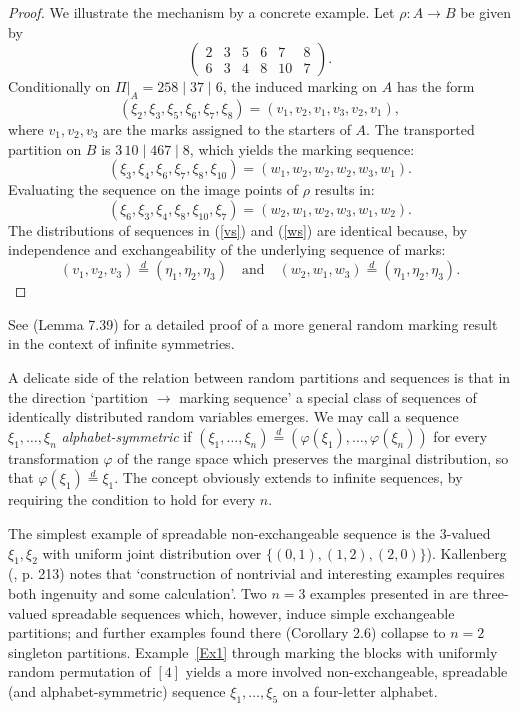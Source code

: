 \documentclass{article}
\begin{document}
\begin{proof} 
We illustrate the mechanism by a concrete example. Let $\rho:A\to B$ be given by
$$
\begin{pmatrix}
  2 & 3 & 5 & 6 & 7 & 8 \\
  6 & 3 & 4 & 8 & 10 & 7
\end{pmatrix}.
$$
Conditionally on $\Pi|_A = 258 \mid 37 \mid 6$, the induced marking on $A$ has the form 
\begin{equation}\label{vs}
(\xi_2,\xi_3,\xi_5,\xi_6,\xi_7,\xi_8)=(v_1,v_2,v_1,v_3,v_2,v_1),
\end{equation}
where $v_1, v_2, v_3$ are the marks assigned to the starters of $A$.
The transported partition on $B$ is $3\,10 \mid 467 \mid 8$, which yields the marking sequence:
$$(\xi_3,\xi_4,\xi_6,\xi_7,\xi_{8},\xi_{10})=(w_1,w_2,w_2,w_2,w_3,w_1).$$
Evaluating the sequence on the image points of $\rho$ results in:
\begin{equation}\label{ws}
(\xi_6,\xi_3,\xi_4,\xi_8,\xi_{10},\xi_{7})=(w_2,w_1,w_2,w_3,w_1,w_2).
\end{equation}
The distributions of sequences in (\ref{vs}) and (\ref{ws}) are identical because, by independence and exchangeability of the underlying sequence of marks:
$$
(v_1,v_2,v_3) \stackrel{d}{=} (\eta_1,\eta_2,\eta_3) \quad \text{and} \quad (w_2,w_1,w_3) \stackrel{d}{=} (\eta_1,\eta_2,\eta_3).
$$
\end{proof}
See \cite{Kallenberg} (Lemma 7.39) for a detailed proof of a more general random marking result in the context of infinite symmetries.



A delicate side of the relation between random partitions and sequences is that in the direction `partition $\to$ marking sequence' a special class of sequences of identically distributed random variables 
emerges. We may call a sequence $\xi_1,\ldots,\xi_n$
{\it alphabet-symmetric} if  $(\xi_1,\ldots, \xi_n)\stackrel{d}{=}(\varphi(\xi_1),\ldots, \varphi(\xi_n))$ for every 
 transformation $\varphi$ of the range space which preserves the marginal distribution, so that $\varphi(\xi_1)\stackrel{d}{=}\xi_1$. 
The concept obviously extends to infinite sequences, by requiring the condition to hold for every $n$.



The simplest example of spreadable non-exchangeable sequence is 
the $3$-valued $\xi_1,\xi_2$ with uniform joint distribution over $\{(0,1), (1,2), (2,0)\}$).
Kallenberg (\cite{KallenbergPTRF}, p. 213)  notes that `construction of nontrivial and interesting examples requires both ingenuity and some calculation'.
Two $n=3$ examples presented in \cite{KallenbergPTRF} are three-valued spreadable sequences which, however,  induce simple exchangeable partitions;
and further examples found there (Corollary 2.6) collapse to $n=2$ singleton partitions.
 Example~\ref{Ex1} through  marking the blocks with  uniformly random permutation of $[4]$ yields a more involved non-exchangeable, spreadable (and alphabet-symmetric) sequence $\xi_1,\ldots,\xi_5$
on  a four-letter alphabet.
\end{document}
